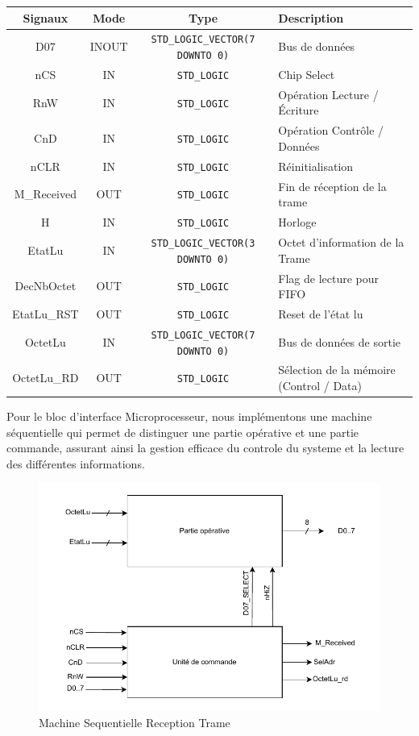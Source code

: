 \begin{center}
\renewcommand{\arraystretch}{1.2} %
\small %
    \begin{tabularx}{\textwidth}{|c||c|c|X|}
     \hline		
       \textbf{Signaux} & \textbf{Mode} & \textbf{Type} & \textbf{Description}  \\ \hline 
       D07 & INOUT & \texttt{STD\_LOGIC\_VECTOR(7 DOWNTO 0)} & Bus de données \\
       nCS & IN & \texttt{STD\_LOGIC} & Chip Select \\
       RnW & IN & \texttt{STD\_LOGIC} & Opération Lecture / Écriture \\
       CnD & IN & \texttt{STD\_LOGIC} & Opération Contrôle / Données \\
       nCLR & IN & \texttt{STD\_LOGIC} & Réinitialisation \\
       M\_Received & OUT & \texttt{STD\_LOGIC} & Fin de réception de la trame \\
       H & IN & \texttt{STD\_LOGIC} & Horloge \\
       EtatLu & IN & \texttt{STD\_LOGIC\_VECTOR(3 DOWNTO 0)} & Octet d'information de la Trame \\
       DecNbOctet & OUT & \texttt{STD\_LOGIC} & Flag de lecture pour FIFO \\
       EtatLu\_RST & OUT & \texttt{STD\_LOGIC} & Reset de l'état lu \\
       OctetLu & IN & \texttt{STD\_LOGIC\_VECTOR(7 DOWNTO 0)} & Bus de données de sortie \\
       OctetLu\_RD & OUT & \texttt{STD\_LOGIC} & Sélection de la mémoire (Control / Data) \\
     \hline  
    \end{tabularx}
\end{center}

Pour le bloc d'interface Microprocesseur, nous implémentons une machine séquentielle qui permet de distinguer une partie opérative et une partie commande, assurant ainsi la gestion efficace du controle du systeme et la lecture des différentes informations.

\begin{figure}[H]
    \centering
    \includegraphics[width=0.8\linewidth]{images/inter/Machine_Seq_Interface_Micro.pdf}
    \caption{Machine Sequentielle Reception Trame}
    \label{fig:placeholder}
\end{figure}

